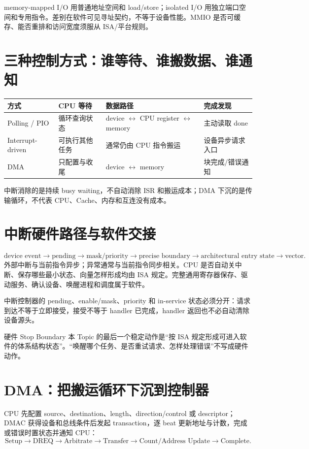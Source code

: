 \documentclass[UTF8,fontset=fandol,11pt,a4paper]{ctexart}
\begin{document}
memory-mapped I/O 用普通地址空间和 load/store；isolated I/O 用独立端口空间和专用指令。差别在软件可见寻址契约，不等于设备性能。MMIO 是否可缓存、能否重排和访问宽度须服从 ISA/平台规则。

\section{三种控制方式：谁等待、谁搬数据、谁通知}
\begin{center}\small
\begin{tabularx}{\linewidth}{L{2.0cm}YYY}\toprule
方式 & CPU 等待 & 数据路径 & 完成发现\\\midrule
Polling / PIO & 循环查询状态 & device $\leftrightarrow$ CPU register $\leftrightarrow$ memory & 主动读取 done\\
Interrupt-driven & 可执行其他任务 & 通常仍由 CPU 指令搬运 & 设备异步请求入口\\
DMA & 只配置与收尾 & device $\leftrightarrow$ memory & 块完成/错误通知\\
\bottomrule
\end{tabularx}
\end{center}
中断消除的是持续 busy waiting，不自动消除 ISR 和搬运成本；DMA 下沉的是传输循环，不代表 CPU、Cache、内存和互连没有成本。

\section{中断硬件路径与软件交接}
\[
\text{device event}\to\text{pending}\to\text{mask/priority}\to\text{precise boundary}\to\text{architectural entry state}\to\text{vector}.
\]
外部中断与当前指令异步；异常通常与当前指令同步相关。CPU 是否自动关中断、保存哪些最小状态、向量怎样形成均由 ISA 规定。完整通用寄存器保存、驱动服务、确认设备、唤醒进程和调度属于软件。

中断控制器的 pending、enable/mask、priority 和 in-service 状态必须分开：请求到达不等于立即接受，接受不等于 handler 已完成，handler 返回也不必自动清除设备源头。

\begin{methodbox}{硬件 Stop Boundary}
本 Topic 的最后一个稳定动作是“按 ISA 规定形成可进入软件的体系结构状态”。“唤醒哪个任务、是否重试请求、怎样处理错误”不写成硬件动作。
\end{methodbox}

\section{DMA：把搬运循环下沉到控制器}
CPU 先配置 source、destination、length、direction/control 或 descriptor；DMAC 获得设备和总线条件后发起 transaction，逐 beat 更新地址与计数，完成或错误时置状态并通知 CPU：
\[
\text{Setup}\to\text{DREQ}\to\text{Arbitrate}\to\text{Transfer}\to\text{Count/Address Update}\to\text{Complete}.
\]
\end{document}
